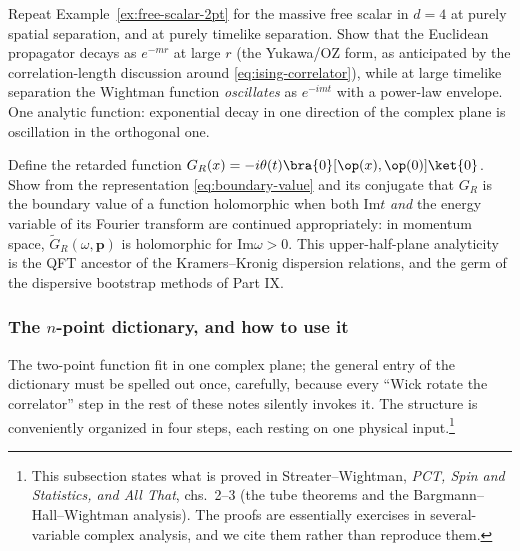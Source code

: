 \begin{exercise}[easy]
\label{exr:massive-wightman}
Repeat Example~\ref{ex:free-scalar-2pt} for the massive free scalar in $d=4$ at
purely spatial separation, and at purely timelike separation. Show that the
Euclidean propagator decays as $e^{-mr}$ at large $r$ (the Yukawa/OZ form, as
anticipated by the correlation-length discussion around
\eqref{eq:ising-correlator}), while at large timelike separation the Wightman
function \emph{oscillates} as $e^{-imt}$ with a power-law envelope. One
analytic function: exponential decay in one direction of the complex plane is
oscillation in the orthogonal one.
\end{exercise}

\begin{exercise}[medium]
\label{exr:retarded}
Define the retarded function $G_R(x) = -i\theta(t)\bra{0}[\op(x),
\op(0)]\ket{0}$. Show from the representation \eqref{eq:boundary-value} and its
conjugate that $G_R$ is the boundary value of a function holomorphic when both
$\mathrm{Im}t$ \emph{and} the energy variable of its Fourier transform are
continued appropriately: in momentum space, $\tilde G_R(\omega, \mathbf{p})$ is
holomorphic for $\mathrm{Im}\omega > 0$. This upper-half-plane analyticity is
the QFT ancestor of the Kramers--Kronig dispersion relations, and the germ of
the dispersive bootstrap methods of Part IX.
\end{exercise}

\subsubsection{The $n$-point dictionary, and how to use it}
\label{sec:npoint-dictionary}

The two-point function fit in one complex plane; the general entry of the
dictionary must be spelled out once, carefully, because every
``Wick rotate the correlator'' step in the rest of these notes silently
invokes it. The structure is conveniently organized in four steps, each
resting on one physical input.\footnote{This subsection states what is
proved in Streater--Wightman, \emph{PCT, Spin and Statistics, and All That},
chs.\ 2--3 (the tube theorems and the Bargmann--Hall--Wightman analysis).
The proofs are essentially exercises in several-variable complex analysis,
and we cite them rather than reproduce them.}

